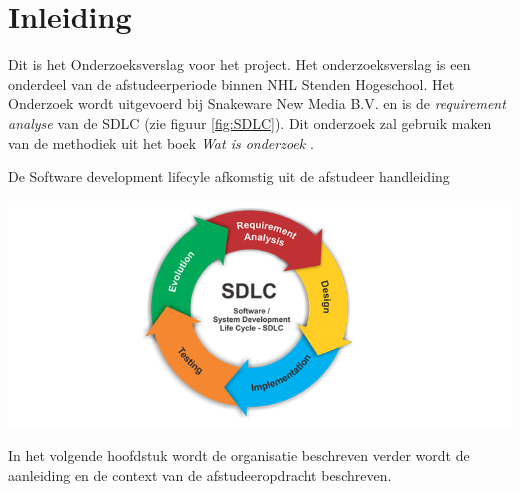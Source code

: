 \chapter{Inleiding}
Dit is het Onderzoeksverslag voor het  project.
Het onderzoeksverslag is een onderdeel van de afstudeerperiode binnen NHL Stenden Hogeschool.
Het Onderzoek wordt uitgevoerd bij Snakeware New Media B.V. en is de \textit{requirement analyse} van de \gls{SDLC} (zie figuur \ref{fig:SDLC}).
Dit onderzoek zal gebruik maken van de methodiek uit het boek \textit{Wat is onderzoek} \Parencite{Verhoeven}.

\whitespace
\begin{graphic}
    \vspace{0.2cm}
    \captionsetup{type=figure}
    \caption{De Software development lifecyle afkomstig uit de afstudeer handleiding \Parencite{Afstudeerhandleiding}}
    \includegraphics[scale=0.5]{img/SDLC.png}
    \label{fig:SDLC}
    \vspace{0.2cm}
\end{graphic}

\whitespace
In het volgende hoofdstuk wordt de organisatie beschreven verder wordt de aanleiding en de context van de afstudeeropdracht beschreven.




% 

